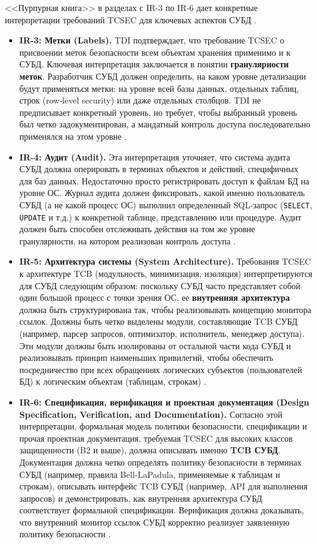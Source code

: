 <<Пурпурная книга>> в разделах с IR-3 по IR-6 дает конкретные интерпретации требований TCSEC для ключевых аспектов СУБД \cite{PurpleBook}.
\begin{itemize}
	\item \textbf{IR-3: Метки (Labels).} TDI подтверждает, что требование TCSEC о присвоении меток безопасности всем объектам хранения применимо и к СУБД. Ключевая интерпретация заключается в понятии \textbf{гранулярности меток}. Разработчик СУБД должен определить, на каком уровне детализации будут применяться метки: на уровне всей базы данных, отдельных таблиц, строк (row-level security) или даже отдельных столбцов. TDI не предписывает конкретный уровень, но требует, чтобы выбранный уровень был четко задокументирован, а мандатный контроль доступа последовательно применялся на этом уровне \cite[IR-3]{PurpleBook}.
	\item \textbf{IR-4: Аудит (Audit).} Эта интерпретация уточняет, что система аудита СУБД должна оперировать в терминах объектов и действий, специфичных для баз данных. Недостаточно просто регистрировать доступ к файлам БД на уровне ОС. Журнал аудита должен фиксировать, какой именно пользователь СУБД (а не какой процесс ОС) выполнил определенный SQL-запрос (\texttt{SELECT}, \texttt{UPDATE} и т.д.) к конкретной таблице, представлению или процедуре. Аудит должен быть способен отслеживать действия на том же уровне гранулярности, на котором реализован контроль доступа \cite[IR-4]{PurpleBook}.
	\item \textbf{IR-5: Архитектура системы (System Architecture).} Требования TCSEC к архитектуре TCB (модульность, минимизация, изоляция) интерпретируются для СУБД следующим образом: поскольку СУБД часто представляет собой один большой процесс с точки зрения ОС, ее \textbf{внутренняя архитектура} должна быть структурирована так, чтобы реализовывать концепцию монитора ссылок. Должны быть четко выделены модули, составляющие TCB СУБД (например, парсер запросов, оптимизатор, исполнитель, менеджер доступа). Эти модули должны быть изолированы от остальной части кода СУБД и реализовывать принцип наименьших привилегий, чтобы обеспечить посредничество при всех обращениях логических субъектов (пользователей БД) к логическим объектам (таблицам, строкам) \cite[IR-5]{PurpleBook}.
	\item \textbf{IR-6: Спецификация, верификация и проектная документация (Design Specification, Verification, and Documentation).} Согласно этой интерпретации, формальная модель политики безопасности, спецификации и прочая проектная документация, требуемая TCSEC для высоких классов защищенности (B2 и выше), должна описывать именно \textbf{TCB СУБД}. Документация должна четко определять политику безопасности в терминах СУБД (например, правила Bell-LaPadula, применяемые к таблицам и строкам), описывать интерфейс TCB СУБД (например, API для выполнения запросов) и демонстрировать, как внутренняя архитектура СУБД соответствует формальной спецификации. Верификация должна доказывать, что внутренний монитор ссылок СУБД корректно реализует заявленную политику безопасности \cite[IR-6]{PurpleBook}.
\end{itemize}

